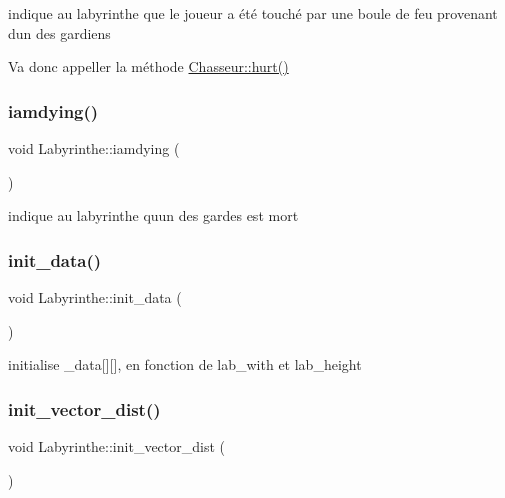 indique au labyrinthe que le joueur a été touché par une boule de feu provenant d\textquotesingle{}un des gardiens 

Va donc appeller la méthode \hyperlink{classChasseur_ac75a09254dea5b1d25c7dbf49809a273}{Chasseur\+::hurt()} \mbox{\label{classLabyrinthe_a987dc5663797cae6f75853e24a9f3ffb}} 
\subsubsection{\texorpdfstring{iamdying()}{iamdying()}}
{\footnotesize\ttfamily void Labyrinthe\+::iamdying (\begin{DoxyParamCaption}{ }\end{DoxyParamCaption})\hspace{0.3cm}{\ttfamily [inline]}}



indique au labyrinthe qu\textquotesingle{}un des gardes est mort 

\mbox{\label{classLabyrinthe_afc3f86c4ce00a37bd2b033d1e343c7c5}} 
\subsubsection{\texorpdfstring{init\+\_\+data()}{init\_data()}}
{\footnotesize\ttfamily void Labyrinthe\+::init\+\_\+data (\begin{DoxyParamCaption}{ }\end{DoxyParamCaption})\hspace{0.3cm}{\ttfamily [private]}}



initialise \+\_\+data\mbox{[}\mbox{]}\mbox{[}\mbox{]}, en fonction de lab\+\_\+with et lab\+\_\+height 

\mbox{\label{classLabyrinthe_aabe4e77af2b2e156608741a0b08aabdc}} 
\subsubsection{\texorpdfstring{init\+\_\+vector\+\_\+dist()}{init\_vector\_dist()}}
{\footnotesize\ttfamily void Labyrinthe\+::init\+\_\+vector\+\_\+dist (\begin{DoxyParamCaption}{ }\end{DoxyParamCaption})\hspace{0.3cm}{\ttfamily [private]}}



